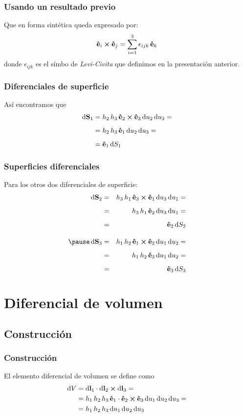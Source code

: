 \documentclass[12pt]{beamer}
\begin{document}
\begin{frame}
\frametitle{Usando un resultado previo}
Que en forma sintética queda expresado por:
\begin{align}
\vu{e}_{i} \cp \vu{e}_{j} = \sum_{i=1}^{3} \epsilon_{ijk} \, \vu{e}_{k}
\end{align}
donde $\epsilon_{ijk}$ es el símbo de \emph{Levi-Civita} que definimos en la presentación anterior.
\end{frame}
\begin{frame}
\frametitle{Diferenciales de superficie}
Así encontramos que
\begin{align*}
\dd{\vb{S}_{1}} &= h_{2} \, h_{3} \, \vu{e}_{2} \cp \vu{e}_{3} \dd{u_{2}} \dd{u_{3}} = \\[0.5em]
&= h_{2} \, h_{3} \, \vu{e}_{1} \dd{u_{2}} \dd{u_{3}} = \\[0.5em]
&= \vu{e}_{1} \dd{S_{1}}
\end{align*}
\end{frame}
\begin{frame}
\frametitle{Superficies diferenciales}
Para los otros dos diferenciales de superficie:
\fontsize{12}{12}\selectfont
\begin{eqnarray*}
\dd{\vb{S}_{2}} &=& h_{3} \, h_{1} \, \vu{e}_{3} \cp \vu{e}_{1} \dd{u_{3}} \dd{u_{1}} = \\[0.5em]
&=& h_{3} \, h_{1} \, \vu{e}_{2} \dd{u_{3}} \dd{u_{1}} = \\[0.5em]
&=& \vu{e}_{2} \dd{S_{2}} \\[1em]
\pause
\dd{\vb{S}_{3}} &=& h_{1} \, h_{2} \, \vu{e}_{1} \cp \vu{e}_{2} \dd{u_{1}} \dd{u_{2}} = \\[0.5em]
&=& h_{1} \, h_{2} \, \vu{e}_{3} \dd{u_{1}} \dd{u_{2}} = \\[0.5em]
&=& \vu{e}_{3} \dd{S_{3}}
\end{eqnarray*}
\end{frame}
\section{Diferencial de volumen}
\subsection{Construcción}
\begin{frame}
\frametitle{Construcción}
El elemento diferencial de volumen se define como
\begin{align*}
\dd{V} &= \dd{\vb{l}_{1}} \cdot \dd{\vb{l}_{2}} \cp \dd{\vb{l}_{3}} = \\
&= h_{1} \, h_{2} \, h_{3} \, \vu{e}_{1} \cdot \vu{e}_{2} \cp \vu{e}_{3} \dd{u_{1}} \dd{u_{2}} \dd{u_{3}} = \\
&= h_{1} \, h_{2} \, h_{3} \dd{u_{1}} \dd{u_{2}} \dd{u_{3}}
\end{align*}
\end{frame}
\end{document}
